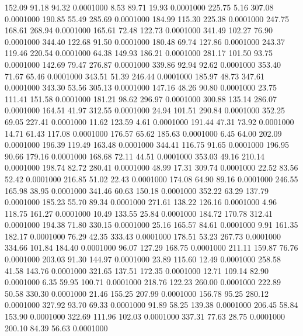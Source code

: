  152.09   91.18   94.32   0.0001000
   8.53   89.71   19.93   0.0001000
 225.75    5.16  307.08   0.0001000
 190.85   55.49  285.69   0.0001000
 184.99  115.30  225.38   0.0001000
 247.75  168.61  268.94   0.0001000
 165.61   72.48  122.73   0.0001000
 341.49  102.27   76.90   0.0001000
 344.40  122.68   91.50   0.0001000
 180.48   69.74  127.86   0.0001000
 243.37  119.46  220.54   0.0001000
  64.38  149.93  186.21   0.0001000
 281.17  101.50   93.75   0.0001000
 142.69   79.47  276.87   0.0001000
 339.86   92.94   92.62   0.0001000
 353.40   71.67   65.46   0.0001000
 343.51   51.39  246.44   0.0001000
 185.97   48.73  347.61   0.0001000
 343.30   53.56  305.13   0.0001000
 147.16   48.26   90.80   0.0001000
  23.75  111.41  151.58   0.0001000
 181.21   98.62  296.97   0.0001000
 300.88  135.14  286.07   0.0001000
 164.51   41.97  312.55   0.0001000
  24.94  101.51  290.84   0.0001000
 352.25   69.05  227.41   0.0001000
  11.62  123.59    4.61   0.0001000
 191.44   47.31   73.92   0.0001000
  14.71   61.43  117.08   0.0001000
 176.57   65.62  185.63   0.0001000
   6.45   64.00  202.09   0.0001000
 196.39  119.49  163.48   0.0001000
 344.41  116.75   91.65   0.0001000
 196.95   90.66  179.16   0.0001000
 168.68   72.11   44.51   0.0001000
 353.03   49.16  210.14   0.0001000
 198.74   82.72  280.41   0.0001000
  48.99   17.31  309.74   0.0001000
  22.52   83.56   52.42   0.0001000
 216.85   51.02   22.43   0.0001000
 174.08   64.90   89.16   0.0001000
 246.55  165.98   38.95   0.0001000
 341.46   60.63  150.18   0.0001000
 352.22   63.29  137.79   0.0001000
 185.23   55.70   89.34   0.0001000
 271.61  138.22  126.16   0.0001000
   4.96  118.75  161.27   0.0001000
  10.49  133.55   25.84   0.0001000
 184.72  170.78  312.41   0.0001000
 194.38   71.80  330.15   0.0001000
  25.16  165.57   84.61   0.0001000
   9.91  161.35  182.17   0.0001000
  76.29   42.35  333.43   0.0001000
 178.51   53.23  267.73   0.0001000
 334.66  101.84  184.40   0.0001000
  96.07  127.29  168.75   0.0001000
 211.11  159.87   76.76   0.0001000
 203.03   91.30  144.97   0.0001000
  23.89  115.60   12.49   0.0001000
 258.58   41.58  143.76   0.0001000
 321.65  137.51  172.35   0.0001000
  12.71  109.14   82.90   0.0001000
   6.35   59.95  100.71   0.0001000
 218.76  122.23  260.00   0.0001000
 222.89   50.58  330.30   0.0001000
  21.46  155.25  207.99   0.0001000
 156.78   95.25  280.12   0.0001000
 327.92   93.70   69.33   0.0001000
  91.89   58.25  139.38   0.0001000
 206.45   58.84  153.90   0.0001000
 322.69  111.96  102.03   0.0001000
 337.31   77.63   28.75   0.0001000
 200.10   84.39   56.63   0.0001000

